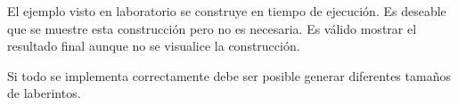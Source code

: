 El ejemplo visto en laboratorio se construye en tiempo de ejecución. Es deseable que se muestre esta construcción pero no es necesaria. Es válido mostrar el resultado final aunque no se visualice la construcción.

Si todo se implementa correctamente debe ser posible generar diferentes tamaños de laberintos.




